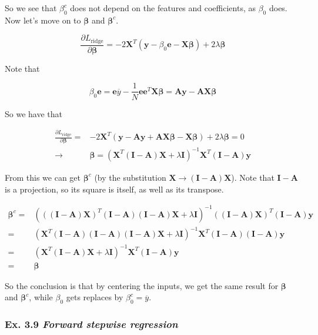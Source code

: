 \documentclass{article}
\begin{document}
So we see that $\beta^c_0$ does not depend on the features and coefficients, as $\beta_0$ does. Now let's move on to $\bm{\beta}$ and $\bm{\beta}^c$.

\[
\frac{\partial L_{\text{ridge}}}{\partial \bm{\beta}} = -2\mathbf{X}^T (\mathbf{y} - \beta_0 \mathbf{e} - \mathbf{X}\bm{\beta}) + 2\lambda \bm{\beta}
\]

Note that

\[
\beta_0 \mathbf{e} = \mathbf{e} \overline{y} - \frac1N \mathbf{e} \mathbf{e}^T \mathbf{X} \bm{\beta} = \mathbf{A}\mathbf{y} - \mathbf{A}\mathbf{X}\bm{\beta}
\]

So we have that

\[
\begin{split}
\frac{\partial L_{\text{ridge}}}{\partial \bm{\beta}} =& -2\mathbf{X}^T (\mathbf{y} - \mathbf{A}\mathbf{y} + \mathbf{A}\mathbf{X}\bm{\beta} - \mathbf{X}\bm{\beta}) + 2\lambda \bm{\beta} = 0\\
\to& \bm{\beta} = (\mathbf{X}^T(\mathbf{I} - \mathbf{A})\mathbf{X} + \lambda \mathbf{I})^{-1} \mathbf{X}^T (\mathbf{I} - \mathbf{A})\mathbf{y}
\end{split}
\]

From this we can get $\bm{\beta}^c$ (by the substitution $\mathbf{X} \to (\mathbf{I} - \mathbf{A})\mathbf{X}$). Note that $\mathbf{I} - \mathbf{A}$ is a projection, so its square is itself, as well as its transpose.

\[
\begin{split}
\bm{\beta}^c =& (((\mathbf{I} - \mathbf{A})\mathbf{X})^T(\mathbf{I} - \mathbf{A})(\mathbf{I} - \mathbf{A})\mathbf{X} + \lambda \mathbf{I})^{-1} ((\mathbf{I} - \mathbf{A})\mathbf{X})^T (\mathbf{I} - \mathbf{A})\mathbf{y}\\
=& (\mathbf{X}^T(\mathbf{I} - \mathbf{A})(\mathbf{I} - \mathbf{A})(\mathbf{I} - \mathbf{A})\mathbf{X} + \lambda \mathbf{I})^{-1} \mathbf{X}^T (\mathbf{I} - \mathbf{A})(\mathbf{I} - \mathbf{A})\mathbf{y}\\
=& (\mathbf{X}^T(\mathbf{I} - \mathbf{A})\mathbf{X} + \lambda \mathbf{I})^{-1} \mathbf{X}^T (\mathbf{I} - \mathbf{A})\mathbf{y}\\
=& \bm{\beta}
\end{split}
\]

So the conclusion is that by centering the inputs, we get the same result for $\bm{\beta}$ and $\bm{\beta}^c$, while $\beta_0$ gets replaces by $\beta^c_0 = \overline{y}$.

\subsubsection{Ex. 3.9 \emph{Forward stepwise regression}}
\end{document}
